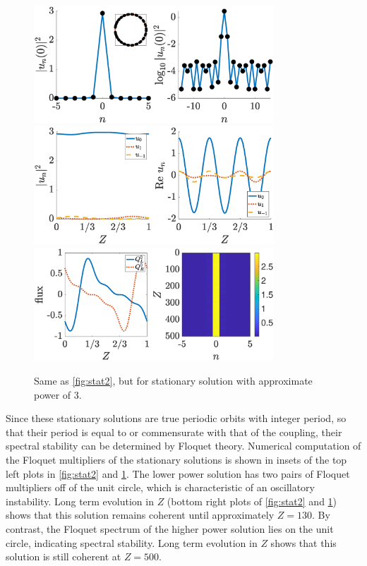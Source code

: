 \documentclass[reprint, amsmath,amssymb,aps,pre]{revtex4-2}
\begin{document}
\begin{figure}
    \centering
    \includegraphics[width=9cm]{stat3a.eps}
    \includegraphics[width=9cm]{stat3b.eps}
    \includegraphics[width=9cm]{stat3c.eps}
    \caption{Same as \cref{fig:stat2}, but for stationary solution with approximate power of 3.}
    \label{fig:stat3}
\end{figure}

Since these stationary solutions are true periodic orbits with integer period, so that their period is equal to or commensurate with that of the coupling, their spectral stability can be determined by Floquet theory. Numerical computation of the Floquet multipliers of the stationary solutions is shown in insets of the top left plots in \cref{fig:stat2} and \cref{fig:stat3}. The lower power solution has two pairs of Floquet multipliers off of the unit circle, which is characteristic of an oscillatory instability. Long term evolution in $Z$ (bottom right plots of \cref{fig:stat2} and \cref{fig:stat3}) shows that this solution remains coherent until approximately $Z=130$. By contrast, the Floquet spectrum of the higher power solution lies on the unit circle, indicating spectral stability. Long term evolution in $Z$ shows that this solution is still coherent at $Z=500$.
\end{document}
